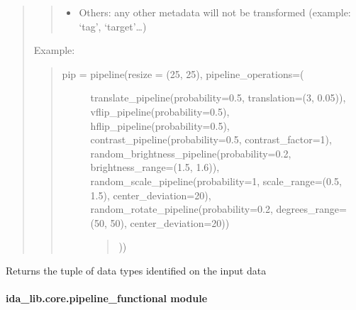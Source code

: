 \documentclass[letterpaper,10pt,english]{sphinxmanual}
\begin{document}
\begin{fulllineitems}
\begin{quote}
\begin{description}
\begin{quote}
\begin{description}
\begin{itemize}
\item {} 
Others: any other metadata will not be transformed (example: ‘tag’, ‘target’…)

\end{itemize}

\end{description}
\end{quote}

\end{description}

Example:
\begin{quote}
\begin{description}
\item[{pip = pipeline(resize = (25, 25),  pipeline\_operations=(}] \leavevmode
translate\_pipeline(probability=0.5, translation=(3, 0.05)),
vflip\_pipeline(probability=0.5),
hflip\_pipeline(probability=0.5),
contrast\_pipeline(probability=0.5, contrast\_factor=1),
random\_brightness\_pipeline(probability=0.2, brightness\_range=(1.5, 1.6)),
random\_scale\_pipeline(probability=1, scale\_range=(0.5, 1.5), center\_deviation=20),
random\_rotate\_pipeline(probability=0.2, degrees\_range=(\sphinxhyphen{}50, 50), center\_deviation=20))
\begin{quote}

))
\end{quote}

\end{description}
\end{quote}
\end{quote}

\begin{fulllineitems}
\label{\detokenize{ida_lib.core:ida_lib.core.pipeline.Pipeline.get_data_types}}
Returns the tuple of data types identified on the input data

\end{fulllineitems}


\end{fulllineitems}



\paragraph{ida\_lib.core.pipeline\_functional module}
\label{\detokenize{ida_lib.core:module-ida_lib.core.pipeline_functional}}\label{\detokenize{ida_lib.core:ida-lib-core-pipeline-functional-module}}
\end{document}
